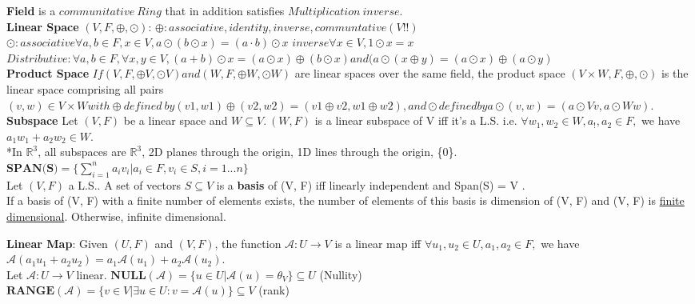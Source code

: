 \documentclass[10pt,landscape]{article}
\begin{document}
\begin{multicols*}{4}
\textbf{Field} is a $communitative\ Ring$ that in addition satisfies $Multiplication\ inverse.$\\

\textbf{Linear Space} $(V, F, \oplus, \odot)$:
$\oplus: associative, identity, inverse, communtative (V!!)$\\
$\odot: associative \forall a,b \in F, x \in V, a \odot (b \odot x) = (a \cdot b) \odot x$
$inverse \forall x \in V, 1 \odot x = x$\\
$Distributive: \forall a, b \in F, \forall x,y \in V, (a+b) \odot x = (a \odot x) \oplus (b \odot x) and (a \odot (x \oplus y) = (a \odot x) \oplus (a \odot y)$\\

\textbf{Product Space} $If (V, F, \oplus V , \odot V ) and (W, F, \oplus W , \odot W)$ are linear spaces over the same field, the product space $(V \times W, F, \oplus, \odot)$ is the linear space comprising all pairs $(v, w) \in V \times W with \oplus defined\ by (v1, w1) \oplus (v2, w2) = (v1 \oplus v2, w1 \oplus w2), and \odot defined by a \odot (v, w) = (a \odot V v, a \odot W w).$\\

\textbf{Subspace} Let $(V, F)$ be a linear space and $W \subseteq V.\ (W, F)$ is a linear subspace of V iff it's a L.S. i.e. $\forall w_1,w_2 \in W, a_!, a_2 \in F,$ we have $a_1w_1 + a_2w_2 \in W$.\\

*In $\mathbb{R} ^ 3$, all subspaces are $\mathbb{R} ^ 3$, 2D planes through the origin, 1D lines through the origin, \{0\}.\\

$\textbf{SPAN(S)}  = \{ \sum_{i=1}^{n} a_iv_i |a_i \in F, v_i \in S, i = 1...n \} $\\

Let $(V, F)$ a L.S.. A set of vectors $S \subseteq V$ is a \textbf{basis} of (V, F) iff linearly independent and Span(S) = V .\\

If a basis of (V, F) with a finite number of elements
exists, the number of elements of this basis is dimension of (V, F) and (V, F) is
\underline{finite dimensional}. Otherwise, infinite dimensional.

\textbf{Linear Map}: Given $(U, F)$ and $(V, F)$, the function $\mathcal{A}: U \to V$ is a linear map iff $\forall u_1,u_2 \in U, a_1,a_2 \in F,$ we have $\mathcal{A}(a_1u_1 + a_2u_2) = a_1\mathcal{A}(u_1) + a_2\mathcal{A}(u_2)$.\\
Let $\mathcal{A}: U \to V$ linear. 
$\textbf{NULL}(\mathcal{A}) = \{ u \in U |\mathcal{A}(u)=\theta_V \} \subseteq U$ (Nullity)\\
$\textbf{RANGE}(\mathcal{A}) = \{  v \in V | \exists u \in U: v = \mathcal{A}(u) \} \subseteq V$ (rank)\\


\end{multicols*}
\end{document}
